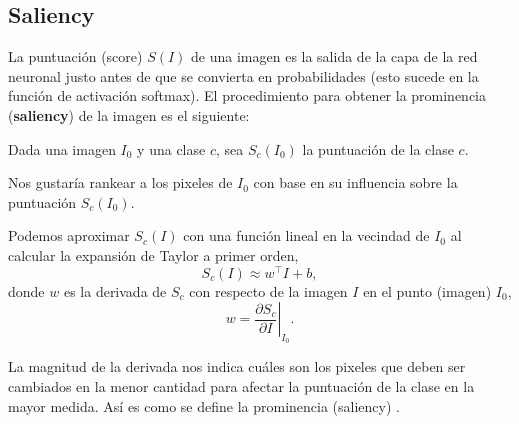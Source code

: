 \pagebreak
    
\subsection{Saliency}
La puntuación (score) $S(I)$ de una imagen es la salida de la capa de la red neuronal justo antes de que se convierta en probabilidades (esto sucede en la función de activación softmax). El procedimiento para obtener la prominencia (\textbf{saliency}) de la imagen es el siguiente:

\noindent
Dada una imagen $I_0$ y una clase $c$, sea $S_c(I_0)$ la puntuación de la clase $c$. 

\noindent
Nos gustaría rankear a los pixeles de $I_0$ con base en su influencia sobre la puntuación $S_c(I_0)$.

\noindent
Podemos aproximar $S_c(I)$ con una función lineal en la vecindad de $I_0$ al calcular la expansión de Taylor a primer orden,
\[S_c(I) \approx w^\top I + b,\]
donde $w$ es la derivada de $S_c$ con respecto de la imagen $I$ en el punto (imagen) $I_0$,
\[w = \left. \frac{\partial S_c}{\partial I} \right |_{I_0}.\]

\noindent
La magnitud de la derivada nos indica cuáles son los pixeles que deben ser cambiados en la menor cantidad para afectar la puntuación de la clase en la mayor medida. Así es como se define la prominencia (saliency) \cite{simonyan2014deep}.


